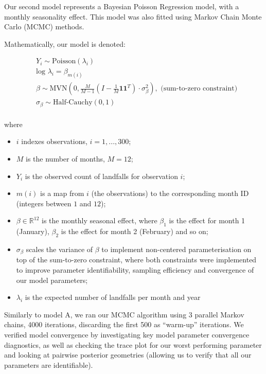 \documentclass[
]{article}
\providecommand{\tightlist}{%
  \setlength{\itemsep}{0pt}\setlength{\parskip}{0pt}}
\begin{document}
Our second model represents a Bayesian Poisson Regression model, with a monthly seasonality effect. This model was also fitted using Markov Chain Monte Carlo (MCMC) methods.

Mathematically, our model is denoted:

\begin{align*}
&Y_{i} \sim \text{Poisson}(\lambda_{i})\\
&\text{log } \lambda_{i} =  \beta_{m(i)}\\
&\beta \sim \text{MVN}( 0, \frac{M}{M-1}( I - \frac{1}{M} \mathbf{1}\mathbf{1}^T) \cdot \sigma_{\beta}^2), \text{  (sum-to-zero constraint)}\\
&\sigma_{\beta} \sim \text{Half-Cauchy}(0,1)\\
\end{align*}

where

\begin{itemize}
\tightlist
\item
  \(i\) indexes observations, \(i=1,...,300\);
\item
  \(M\) is the number of months, \(M = 12\);
\item
  \(Y_{i}\) is the observed count of landfalls for observation \(i\);
\item
  \(m(i)\) is a map from \(i\) (the observations) to the corresponding month ID (integers between \(1\) and \(12\));
\item
  \(\beta \in \mathbb{R}^{12}\) is the monthly seasonal effect, where \(\beta_1\) is the effect for month 1 (January), \(\beta_2\) is the effect for month 2 (February) and so on;
\item
  \(\sigma_{\beta}\) scales the variance of \(\beta\) to implement non-centered parameterisation on top of the sum-to-zero constraint, where both constraints were implemented to improve parameter identifiability, sampling efficiency and convergence of our model parameters;
\item
  \(\lambda_{i}\) is the expected number of landfalls per month and year
\end{itemize}

Similarly to model A, we ran our MCMC algorithm using 3 parallel Markov chains, 4000 iterations, discarding the first 500 as ``warm-up'' iterations. We verified model convergence by investigating key model parameter convergence diagnostics, as well as checking the trace plot for our worst performing parameter and looking at pairwise posterior geometries (allowing us to verify that all our parameters are identifiable).
\end{document}
